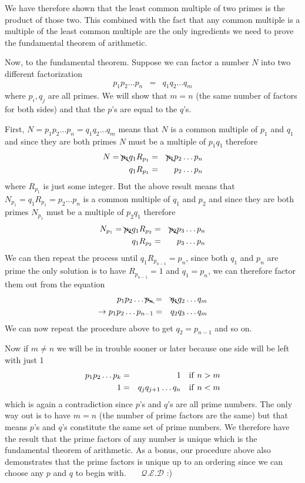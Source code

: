 \documentclass[aps,preprint,preprintnumbers,nofootinbib,showpacs,prd]{revtex4-1}
\newcommand{\nbea}{\begin{eqnarray*}}
\newcommand{\neea}{\end{eqnarray*}}
\begin{document}
We have therefore shown that the least common multiple of two primes is the product of those two. This combined with the fact that any common multiple is a multiple of the least common multiple are the only ingredients we need to prove the fundamental theorem of arithmetic.

Now, to the fundamental theorem. Suppose we can factor a number $N$ into two different factorization
%
\nbea
p_1 p_2 \dots p_n & = & q_1 q_2 \dots q_m
\neea
%
where $p_i, q_j$ are all primes. We will show that $m=n$ (the same number of factors for both sides) and that the $p$'s are equal to the $q$'s.

First, $N=p_1 p_2 \dots p_n = q_1 q_2 \dots q_m$ means that $N$ is a common multiple of $p_1$ and $q_1$ and since they are both primes $N$ must be a multiple of $p_1q_1$ therefore
%
\nbea
N = \bcancel{p_1} q_1 R_{p_1} & = & \bcancel{p_1} p_2 \dots p_n \\
q_1 R_{p_1} & = & p_2 \dots p_n
\neea
%
where $R_{p_1}$ is just some integer. But the above result means that $N_{p_1} = q_1 R_{p_1} = p_2 \dots p_n$ is a common multiple of $q_1$ and $p_2$ and since they are both primes $N_{p_1}$ must be a multiple of $p_2q_1$ therefore
%
\nbea
N_{p_1} = \bcancel{p_2} q_1 R_{p_2} & = & \bcancel{p_2} p_3 \dots p_n \\
q_1 R_{p_2} & = & p_3 \dots p_n
\neea
%
We can then repeat the process until $q_1 R_{p_{n-1}} = p_n$, since both $q_1$ and $p_n$ are prime the only solution is to have $R_{p_{n-1}} = 1$ and $q_1 = p_n$, we can therefore factor them out from the equation
%
\nbea
p_1 p_2 \dots \bcancel{p_n} & = & \bcancel{q_1} q_2 \dots q_m \\
\to p_1 p_2 \dots p_{n-1} & = & q_2 q_3 \dots q_m
\neea
%
We can now repeat the procedure above to get $q_2 = p_{n-1}$ and so on.

Now if $m\neq n$ we will be in trouble sooner or later because one side will be left with just 1
%
\nbea
p_1 p_2 \dots p_k & = & 1 ~~~ {\rm if~} n > m \\
1 & = & q_j q_{j+1} \dots q_n ~~~ {\rm if~} n < m 
\neea
%
which is again a contradiction since $p$'s and $q$'s are all prime numbers. The only way out is to have $m=n$ (the number of prime factors are the same) but that means $p$'s and $q$'s constitute the same set of prime numbers. We therefore have the result that the prime factors of any number is unique which is the fundamental theorem of arithmetic. As a bonus, our procedure above also demonstrates that the prime factors is unique up to an ordering since we can choose any $p$ and $q$ to begin with.~~~ $\mathcal{Q.E.D}$ :)
\end{document}
